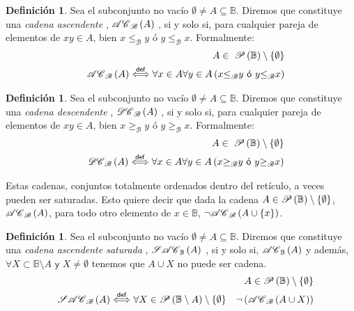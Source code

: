 \documentclass[final,12pt,a4paper,twoside,fleqn]{extbook}
\newcommand{\logicdef}{\ensuremath{
        \stackrel
            {\mathsf{def}}
            {\Longleftrightarrow}
}}
\newcommand{\set}[1]{\ensuremath{\left\lbrace{#1}\right\rbrace}}
\newcommand{\setB}{\ensuremath{\mathbb{B}}}
\newcommand{\algB}{\ensuremath{\mathscr{B}}}
\newcommand{\leqB}{\ensuremath{{\leq}_{\algB}}}
\newcommand{\geqB}{\ensuremath{{\geq}_{\algB}}}
\theoremstyle{definition}
\newtheorem{defn}[thm]{Definición}
\theoremstyle{remark}
\begin{document}
\begin{defn}
Sea el subconjunto no vacío \(\emptyset \neq A \subseteq
\setB\). Diremos que constituye una \emph{ cadena ascendente },
\(\EsCadenaAsc{\algB}{A}\) , si y solo si,
para cualquier pareja de elementos de \(x y \in A\), bien
\(x \leqB y\) ó \(y \leqB x\). Formalmente:
\begin{eqnarray}
\nonumber
&&A \in \;\PartesDeSinVacio{\setB}\\
&&\EsCadenaAsc{\algB}{A} \logicdef \forall x \in A \forall y \in A \left( x
\leqB y \textsf{ ó } y \leqB x \right)
\end{eqnarray}
\end{defn}



\begin{defn}
Sea el subconjunto no vacío \(\emptyset \neq A \subseteq
\setB\). Diremos que constituye una \emph{ cadena descendente },
\(\EsCadenaDesc{\algB}{A}\) , si y solo si,
para cualquier pareja de elementos de \(x y \in A\), bien
\(x \geqB y\) ó \(y \geqB x\). Formalmente:
\begin{eqnarray}
\nonumber
&&A \in \;\PartesDeSinVacio{\setB}\\
&&\EsCadenaDesc{\algB}{A} \logicdef \forall x \in A \forall y \in A \left( x
\geqB y \textsf{ ó } y \geqB x \right)
\end{eqnarray}
\end{defn}



Estas cadenas, conjuntos totalmente ordenados dentro del retículo, a veces
pueden ser saturadas. Esto quiere decir que dada la cadena \(A \in
\PartesDeSinVacio{\setB}\), \(\EsCadenaAsc{\algB}{A}\), para todo otro
elemento de \(x \in \setB\), \(\neg\EsCadenaAsc{\algB}{A\cup\set{x}}\).



\begin{defn}
Sea el subconjunto no vacío \(\emptyset \neq A \subseteq
\setB\). Diremos que constituye una \emph{ cadena ascendente saturada },
\(\EsCadenaAscSat{\setB}{A}\) , si y solo si, \(\EsCadenaAsc{\setB}{A}\) y
además, \(\forall X \subset \setB\setminus A \textsf{ y } X\neq\emptyset\)
tenemos que \(A\cup{X}\) no puede ser cadena.
\begin{eqnarray}
\nonumber
&&A \in\PartesDeSinVacio{\setB}\\
&&\EsCadenaAscSat{\algB}{A} \logicdef \forall X \in
\PartesDeSinVacio{\setB\setminus{A}}
\quad\neg\left(\EsCadenaAsc{\algB}{A\cup{X}}\right)
\end{eqnarray}
\end{defn}
\end{document}
